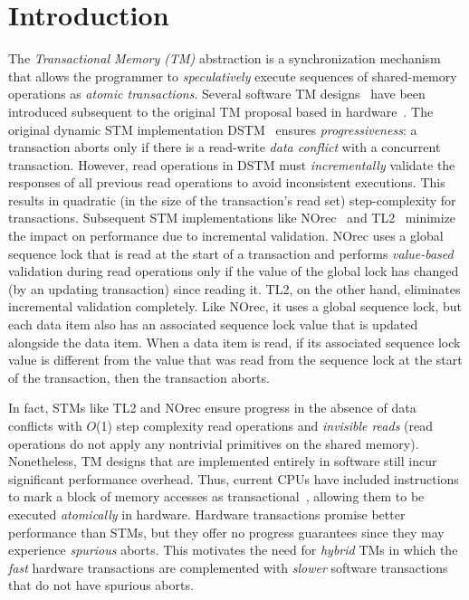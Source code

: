 \section{Introduction}
\label{sec:intro}
%
%
The \emph{Transactional Memory (TM)} abstraction is a synchronization mechanism 
that allows the programmer to \emph{speculatively} execute sequences of shared-memory
operations as \emph{atomic transactions}.
Several software TM designs~\cite{norec, ST95,HLM+03, astm, fraser} have been introduced subsequent to the original TM proposal based in
hardware~\cite{HM93}. 
The original dynamic STM implementation DSTM~\cite{HLM+03} ensures \emph{progressiveness}: 
a transaction aborts only if there is a read-write \emph{data conflict} with a concurrent
transaction. However, read operations in DSTM must \emph{incrementally} validate
the responses of all previous read operations to avoid inconsistent executions. 
This results in quadratic  (in the size of the transaction's read
set) step-complexity for transactions. Subsequent STM 
implementations like NOrec~\cite{norec} and TL2~\cite{DSS06}
minimize the impact on performance due to incremental validation.
NOrec uses a global sequence lock that is read at the start of a transaction and performs \emph{value-based}
validation during read operations only if the value of the global lock has changed (by an updating transaction) 
since reading it.
TL2, on the other hand, eliminates incremental validation completely.
Like NOrec, it uses a global sequence lock, but each data item also 
has an associated sequence lock value that is updated alongside the data item.
When a data item is read, if its associated sequence lock value is different 
from the value that was read from the sequence lock at the start of the transaction, then the transaction aborts.

In fact, STMs like TL2 and NOrec ensure progress in the absence of data conflicts with 
$O$(1) step complexity read operations and \emph{invisible reads} (read operations 
do not apply any nontrivial  primitives on the shared memory).
Nonetheless, TM designs that are implemented entirely in software still incur significant performance overhead.
Thus, current CPUs have included instructions to mark a block of memory accesses as transactional~\cite{Rei12, asf, bluegene}, allowing them to be executed \emph{atomically} in hardware.
Hardware transactions promise better performance than STMs, but they offer no progress guarantees 
since they may experience \emph{spurious} aborts. This motivates the need for
\emph{hybrid} TMs in which the \emph{fast} hardware transactions are 
complemented with \emph{slower} software transactions that do not have spurious aborts.

